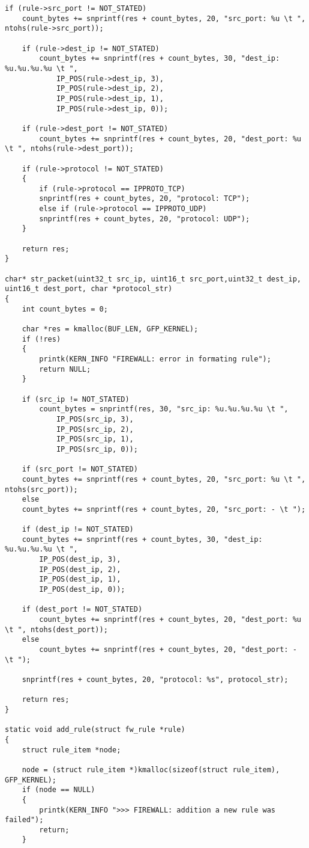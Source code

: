 \begin{lstlisting}[caption = {Загружаемый модуль}, label=lst:code_module]
	if (rule->src_port != NOT_STATED)
	count_bytes += snprintf(res + count_bytes, 20, "src_port: %u \t ", ntohs(rule->src_port));
	
	if (rule->dest_ip != NOT_STATED)
		count_bytes += snprintf(res + count_bytes, 30, "dest_ip: %u.%u.%u.%u \t ",
			IP_POS(rule->dest_ip, 3),
			IP_POS(rule->dest_ip, 2),
			IP_POS(rule->dest_ip, 1),
			IP_POS(rule->dest_ip, 0));
	
	if (rule->dest_port != NOT_STATED)
		count_bytes += snprintf(res + count_bytes, 20, "dest_port: %u \t ", ntohs(rule->dest_port));
	
	if (rule->protocol != NOT_STATED)
	{
		if (rule->protocol == IPPROTO_TCP)
		snprintf(res + count_bytes, 20, "protocol: TCP");
		else if (rule->protocol == IPPROTO_UDP)
		snprintf(res + count_bytes, 20, "protocol: UDP");
	}
	
	return res;
}

char* str_packet(uint32_t src_ip, uint16_t src_port,uint32_t dest_ip, uint16_t dest_port, char *protocol_str)
{
	int count_bytes = 0;
	
	char *res = kmalloc(BUF_LEN, GFP_KERNEL);
	if (!res)
	{
		printk(KERN_INFO "FIREWALL: error in formating rule");
		return NULL;
	}
	
	if (src_ip != NOT_STATED)
		count_bytes = snprintf(res, 30, "src_ip: %u.%u.%u.%u \t ", 
			IP_POS(src_ip, 3), 
			IP_POS(src_ip, 2),
			IP_POS(src_ip, 1),
			IP_POS(src_ip, 0));
	
	if (src_port != NOT_STATED)
	count_bytes += snprintf(res + count_bytes, 20, "src_port: %u \t ", ntohs(src_port));
	else
	count_bytes += snprintf(res + count_bytes, 20, "src_port: - \t ");
	
	if (dest_ip != NOT_STATED)
	count_bytes += snprintf(res + count_bytes, 30, "dest_ip: %u.%u.%u.%u \t ",
		IP_POS(dest_ip, 3),
		IP_POS(dest_ip, 2),
		IP_POS(dest_ip, 1),
		IP_POS(dest_ip, 0));
	
	if (dest_port != NOT_STATED)
		count_bytes += snprintf(res + count_bytes, 20, "dest_port: %u \t ", ntohs(dest_port));
	else
		count_bytes += snprintf(res + count_bytes, 20, "dest_port: - \t ");
	
	snprintf(res + count_bytes, 20, "protocol: %s", protocol_str);
	
	return res;
}

static void add_rule(struct fw_rule *rule)
{
	struct rule_item *node;
	
	node = (struct rule_item *)kmalloc(sizeof(struct rule_item), GFP_KERNEL);
	if (node == NULL)
	{
		printk(KERN_INFO ">>> FIREWALL: addition a new rule was failed");
		return;
	}
	

\end{lstlisting}
